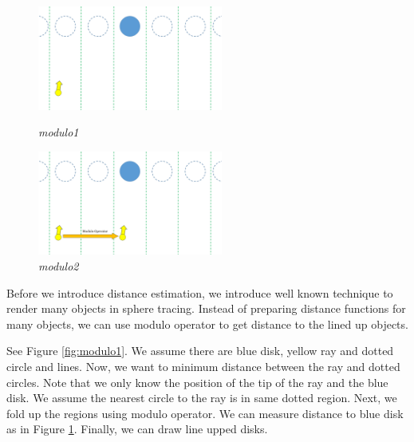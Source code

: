\begin{figure}[htbp]
 \begin{minipage}[t]{0.5\hsize}
  \center
  \includegraphics[height=1.35in, keepaspectratio]{img/preparation/iis3d/modulo1.png}
  \caption{\textit{modulo1}}
  \label{fig:modulo1}
  \hspace*{\fill}
 \end{minipage}
 \begin{minipage}[t]{0.5\hsize}
  \center
  \includegraphics[height=1.35in, keepaspectratio]{img/preparation/iis3d/modulo2.png}
  \caption{\textit{modulo2}}
  \label{fig:modulo2}
  \hspace*{\fill}
 \end{minipage}
\end{figure}

Before we introduce distance estimation, we introduce
well known technique to render many objects in sphere tracing.
Instead of preparing distance functions for many objects, we can use modulo operator
to get distance to the lined up objects.

See Figure \ref{fig:modulo1}. We assume there are blue disk, yellow ray and dotted
circle and lines.
Now, we want to minimum distance between the ray and dotted circles.
Note that we only know the position of the tip of the ray and the blue disk.
We assume the nearest circle to the ray is in same dotted region.
Next, we fold up the regions using modulo operator.
We can measure distance to blue disk as in Figure \ref{fig:modulo2}.
Finally, we can draw line upped disks.

